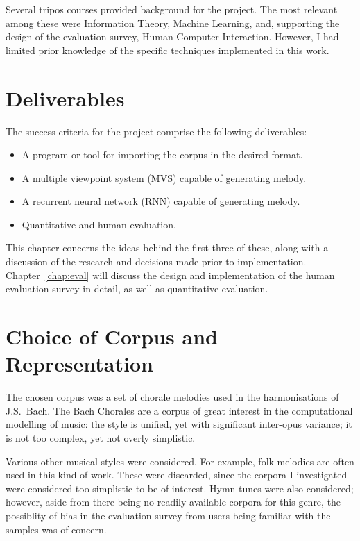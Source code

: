 \documentclass[12pt,a4paper,twoside,openright]{report}
\begin{document}
Several tripos courses provided background for the project. The most relevant
among these were Information Theory, Machine Learning, and, supporting the
design of the evaluation survey, Human Computer Interaction. However, I had
limited prior knowledge of the specific techniques implemented in this work.

\section{Deliverables}

The success criteria for the project comprise the following deliverables:
\begin{itemize}
  \item A program or tool for importing the corpus in the desired format.
  \item A multiple viewpoint system (MVS) capable of generating melody.
  \item A recurrent neural network (RNN) capable of generating melody.
  \item Quantitative and human evaluation.
\end{itemize}

This chapter concerns the ideas behind the first three of these, along with
a discussion of the research and decisions made prior to implementation.
Chapter~\ref{chap:eval} will discuss the design and implementation of the
human evaluation survey in detail, as well as quantitative evaluation.

\section{Choice of Corpus and Representation}\label{sec:corp-rep}

The chosen corpus was a set of chorale melodies used in the harmonisations of
J.S.\ Bach. The Bach Chorales are a corpus of great interest in the
computational modelling of music: the style is unified, yet with significant
inter-opus variance; it is not too complex, yet not overly simplistic.

Various other musical styles were considered. For example, folk melodies are
often used in this kind of work. These were discarded, since the corpora I
investigated were considered too simplistic to be of interest. Hymn tunes were
also considered; however, aside from there being no readily-available corpora
for this genre, the possiblity of bias in the evaluation survey from users being
familiar with the samples was of concern.
\end{document}
